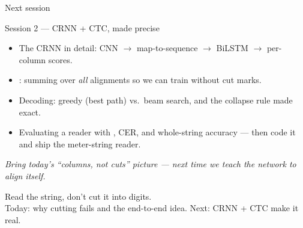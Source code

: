 \documentclass[10pt,aspectratio=169]{beamer}
\begin{document}
\begin{frame}{Next session}
  \begin{alertblock}{Session 2 --- CRNN + CTC, made precise}
    \begin{itemize}
      \item The CRNN in detail: CNN $\rightarrow$ map-to-sequence $\rightarrow$ BiLSTM $\rightarrow$ per-column scores.
      \item {}: summing over \emph{all} alignments so we can train without cut marks.
      \item Decoding: greedy (best path) vs.\ beam search, and the collapse rule made exact.
      \item Evaluating a reader with , CER, and whole-string accuracy --- then code it and ship the meter-string reader.
    \end{itemize}
  \end{alertblock}
  \emph{Bring today's ``columns, not cuts'' picture --- next time we teach the network to align itself.}
\end{frame}

\begin{frame}[standout]
  Read the string, don't cut it into digits.\\[4pt]
  \normalsize Today: why cutting fails and the end-to-end idea. Next: CRNN + CTC make it real.
\end{frame}
\end{document}
